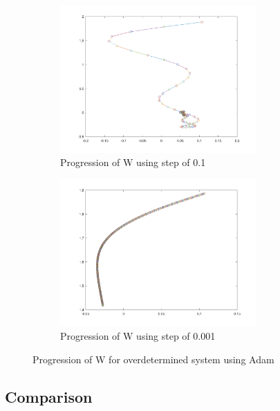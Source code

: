 \documentclass[a4paper]{article}    %
\begin{document}
\begin{figure}[H]
    \centering
    \begin{subfigure}{0.48\textwidth}
        \centering
        \includegraphics[width=7.5cm]{adam_over_step_0_1}
        \caption{Progression of W using step of 0.1}
        \label{fig:adam-over-0_1}
    \end{subfigure}
    \hfill
    \begin{subfigure}{0.48\textwidth}
        \centering
        \includegraphics[width=7.5cm]{adam_over_step_0_001}
        \caption{Progression of W using step of 0.001}
        \label{fig:adam-over-0_001}
    \end{subfigure}
    \hfill
    \caption{Progression of W for overdetermined system using Adam}
    \label{fig:adam-over}
\end{figure}

\newpage

\subsection{Comparison}
\end{document}

